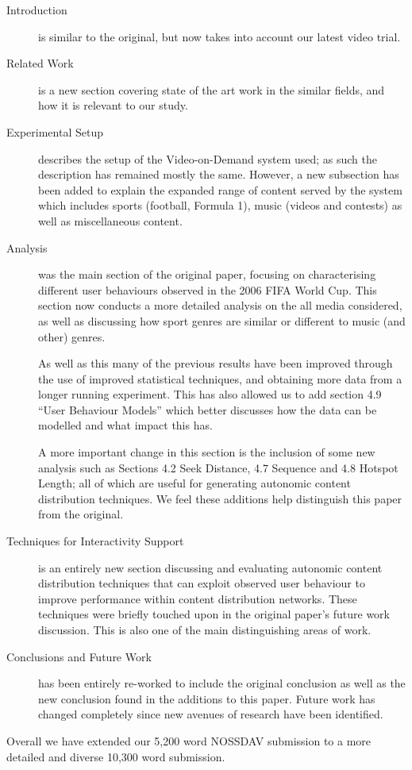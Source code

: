 \documentclass[a4paper]{article}
\begin{document}
\begin{description}
  \item[Introduction]
    is similar to the original, but now takes into account our latest video trial.

  \item[Related Work]
    is a new section covering state of the art work in the similar fields, and how it is relevant to our study.


  \item[Experimental Setup]
    describes the setup of the Video-on-Demand system used; as such the description has remained mostly the same. However, a new subsection has been added to explain the expanded range of content served by the system which includes sports (football, Formula 1), music (videos and contests) as well as miscellaneous content.

  \item[Analysis]
    was the main section of the original paper, focusing on characterising different user behaviours observed in the 2006 FIFA World Cup. This section now conducts a more detailed analysis on the all media considered, as well as discussing how sport genres are similar or different to music (and other) genres.
    
    As well as this many of the previous results have been improved through the use of improved statistical techniques, and obtaining more data from a longer running experiment. This has also allowed us to add section 4.9 ``User Behaviour Models'' which better discusses how the data can be modelled and what impact this has.

    A more important change in this section is the inclusion of some new analysis such as Sections 4.2 Seek Distance, 4.7 Sequence and 4.8 Hotspot Length; all of which are useful for generating autonomic content distribution techniques. We feel these additions help distinguish this paper from the original.

  \item[Techniques for Interactivity Support]
    is an entirely new section discussing and evaluating autonomic content distribution techniques that can exploit observed user behaviour to improve performance within content distribution networks. These techniques were briefly touched upon in the original paper's future work discussion. This is also one of the main distinguishing areas of work.

  \item[Conclusions and Future Work]
    has been entirely re-worked to include the original conclusion as well as the new conclusion found in the additions to this paper. Future work has changed completely since new avenues of research have been identified.

\end{description}

Overall we have extended our 5,200 word NOSSDAV submission to a more detailed and diverse 10,300 word submission.



\end{document}
